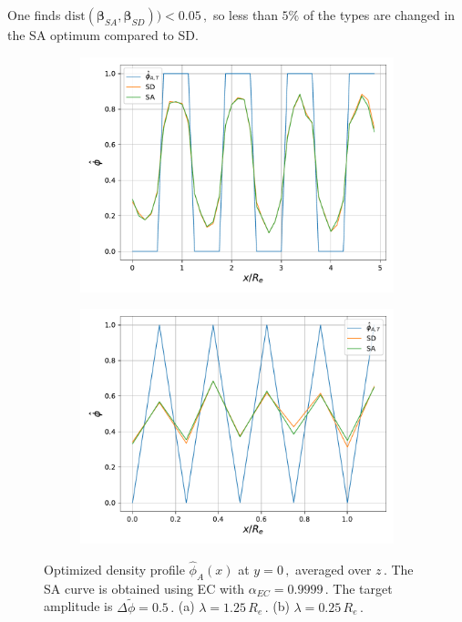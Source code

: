 \documentclass[bachelor,       %
               oneside,        %
               BCOR10mm,       %
               ngerman, english %
               ]{GAUBM}
\begin{document}
One finds $\mathrm{dist}(\pmb\beta_{SA},\pmb\beta_{SD}))<0.05\,,$ so less than $5\%$ of the types are changed in the \ac{SA} optimum compared to \ac{SD}.

\begin{figure}[H]
  \centering
  \begin{subfigure}[b]{0.45\textwidth}
      \centering
      \includegraphics[width=\textwidth]{figures/amplitude_lam1p25_dphi0.5_alpha0.999_seed0.pdf}
      \caption{}
      \label{fig:amplitude_sa_sd_lam1.25}
  \end{subfigure}
    \hfill
  \begin{subfigure}[b]{0.45\textwidth}
      \centering
      \includegraphics[width=\textwidth]{figures/amplitude_lam0p25_dphi0.5_alpha0.9999_seed0.pdf}
      \caption{}
      \label{fig:amplitude_sa_sd_lam0.25}
  \end{subfigure}
     \caption{Optimized density profile $\hat\phi_A(x)$ at $y=0\,,$ averaged over $z\,.$  The \ac{SA} curve is obtained using \ac{EC} with $\alpha_{EC}=0.9999\,.$ The target amplitude is $\Delta\tilde\phi=0.5\,.$ (a) $\lambda=1.25\,R_e\,.$ (b) $\lambda=0.25\,R_e\,.$}
     \label{fig:amplitude_sa_sd}
\end{figure}
\end{document}
